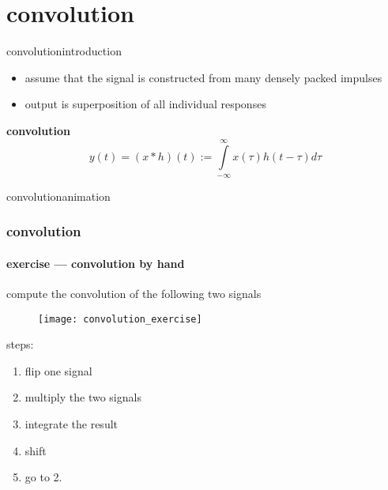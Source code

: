    \section{convolution}
        \begin{frame}{convolution}{introduction}

            \begin{itemize}
                \item<2-> assume that the signal is constructed from many densely packed impulses
                \item<2->[$\Rightarrow$] output is superposition of all individual responses
            \end{itemize}
            \pause
            \bigskip
            \textbf{convolution}
            \begin{equation*}
                y(t) = (x \ast h)(t) := \int\limits_{-\infty}^{\infty}x(\tau)h(t-\tau)d\tau
            \end{equation*}
        \end{frame}
\begin{frame}{convolution}{animation}
            \vspace{-5mm}
            \begin{center}
            \end{center}
\end{frame}
    
\begin{frame}\frametitle{convolution}\framesubtitle{exercise --- convolution by hand}
    compute the convolution of the following two signals
    \begin{figure}%
    \texttt{[image: convolution\_exercise]}%
    \end{figure}
    \bigskip
    steps:
    \begin{enumerate}
        \item   flip one signal
        \item   multiply the two signals
        \item   integrate the result
        \item   shift
        \item   go to 2.
    \end{enumerate}
\end{frame}
    
